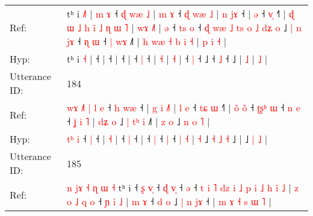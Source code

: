 \documentclass[10pt]{article}
\DeclareRobustCommand{\hl}[1]{{\textcolor{red}{#1}}}
\begin{document}
\begin{longtable}{ll}
Ref: & tʰ i \hl{˩}\hl{˥} |\hl{ }\hl{m}\hl{ }\hl{ɤ} ˧\hl{ }\hl{ɖ}\hl{ }\hl{w}\hl{æ}\hl{ }\hl{˩} |\hl{ }\hl{m}\hl{ }\hl{ɤ} ˧\hl{ }\hl{ɖ}\hl{ }\hl{w}\hl{æ}\hl{ }\hl{˩} |\hl{ }\hl{n}\hl{ }\hl{j}\hl{ɤ} ˧ |\hl{ }\hl{ə} ˧ \hl{v}\hl{̩} ˧\hl{˥} |\hl{ }\hl{ɖ}\hl{ }\hl{ɯ}\hl{ }\hl{˩}\hl{ }\hl{h}\hl{ }\hl{i}\hl{̃}\hl{ }\hl{˩}\hl{ }\hl{ɳ}\hl{ }\hl{ɯ} \hl{˥} |\hl{ }\hl{w}\hl{ɤ} \hl{˩}\hl{˥} |\hl{ }\hl{ə} ˧\hl{ }\hl{t}\hl{s} \hl{o} ˧\hl{ }\hl{ɖ}\hl{ }\hl{w}\hl{æ}\hl{ }\hl{˩}\hl{ }\hl{t}\hl{s}\hl{ }\hl{o}\hl{ }\hl{˩}\hl{ }\hl{d}\hl{ʑ}\hl{ }\hl{o} ˩\hl{ }\hl{|}\hl{ }\hl{n}\hl{ }\hl{j}\hl{ɤ} ˧\hl{ }\hl{ɳ} \hl{ɯ} ˧\hl{ }\hl{|}\hl{ }\hl{w}\hl{ɤ} ˩\hl{˥} |\hl{ }\hl{h}\hl{ }\hl{w}\hl{æ}\hl{ }\hl{˧}\hl{ }\hl{b}\hl{ }\hl{i} \hl{˧} |\hl{ }\hl{p}\hl{ }\hl{i} \hl{˧} |
 \\
Hyp: & tʰ i \hl{}\hl{˧} |\hl{}\hl{}\hl{}\hl{} ˧\hl{}\hl{}\hl{}\hl{}\hl{}\hl{}\hl{} |\hl{}\hl{}\hl{}\hl{} ˧\hl{}\hl{}\hl{}\hl{}\hl{}\hl{}\hl{} |\hl{}\hl{}\hl{}\hl{}\hl{} ˧ |\hl{}\hl{} ˧ \hl{}\hl{|} ˧\hl{} |\hl{}\hl{}\hl{}\hl{}\hl{}\hl{}\hl{}\hl{}\hl{}\hl{}\hl{}\hl{}\hl{}\hl{}\hl{}\hl{}\hl{} \hl{˧} |\hl{}\hl{}\hl{} \hl{}\hl{˧} |\hl{}\hl{} ˧\hl{}\hl{}\hl{} \hl{|} ˧\hl{}\hl{}\hl{}\hl{}\hl{}\hl{}\hl{}\hl{}\hl{}\hl{}\hl{}\hl{}\hl{}\hl{}\hl{}\hl{}\hl{}\hl{}\hl{} ˩\hl{}\hl{}\hl{}\hl{}\hl{}\hl{}\hl{} ˧\hl{}\hl{} \hl{˩} ˧\hl{}\hl{}\hl{}\hl{}\hl{} ˩\hl{} |\hl{}\hl{}\hl{}\hl{}\hl{}\hl{}\hl{}\hl{}\hl{}\hl{}\hl{} \hl{˩} |\hl{}\hl{}\hl{}\hl{} \hl{˩} |
 \\
\midrule
Utterance ID: & 184 \\
Ref: & \hl{w}\hl{ɤ}\hl{ }\hl{˩}\hl{˥}\hl{ }\hl{|}\hl{ }\hl{l} \hl{e} ˧\hl{ }\hl{h} \hl{w}\hl{æ} ˧ |\hl{ }\hl{g}\hl{ }\hl{i} \hl{˩}\hl{˥} |\hl{ }\hl{l}\hl{ }\hl{e} ˧\hl{ }\hl{t}\hl{ɕ} \hl{ɯ} ˧\hl{˥} |\hl{ }\hl{o}\hl{̃}\hl{ }\hl{o}\hl{̃} ˧\hl{ }\hl{ʈ}\hl{ʂ}\hl{ʰ} \hl{ɯ} ˧\hl{ }\hl{n} \hl{e} ˧\hl{ }\hl{ʝ} \hl{i} \hl{˥} |\hl{ }\hl{d}\hl{ʑ} \hl{o} ˩ \hl{|} \hl{t}\hl{ʰ} \hl{i} ˩\hl{˥} |\hl{ }\hl{z}\hl{ }\hl{o} ˩\hl{ }\hl{n} \hl{o} \hl{˥} |
 \\
Hyp: & \hl{}\hl{}\hl{}\hl{}\hl{}\hl{}\hl{}\hl{t}\hl{ʰ} \hl{i} ˧\hl{}\hl{} \hl{}\hl{|} ˧ |\hl{}\hl{}\hl{}\hl{} \hl{}\hl{˧} |\hl{}\hl{}\hl{}\hl{} ˧\hl{}\hl{}\hl{} \hl{|} ˧\hl{} |\hl{}\hl{}\hl{}\hl{}\hl{}\hl{} ˧\hl{}\hl{}\hl{}\hl{} \hl{|} ˧\hl{}\hl{} \hl{|} ˧\hl{}\hl{} \hl{|} \hl{˧} |\hl{}\hl{}\hl{} \hl{˧} ˩ \hl{˧} \hl{}\hl{˩} \hl{˧} ˩\hl{} |\hl{}\hl{}\hl{}\hl{} ˩\hl{}\hl{} \hl{|} \hl{˩} |
 \\
\midrule
Utterance ID: & 185 \\
Ref: & \hl{n}\hl{ }\hl{j}\hl{ɤ}\hl{ }\hl{˧}\hl{ }\hl{ɳ}\hl{ }\hl{ɯ}\hl{ }\hl{˧}\hl{ }tʰ i ˧\hl{ }\hl{ʂ} \hl{v}\hl{̩} ˧\hl{ }\hl{ɖ} \hl{v}\hl{̩} ˧ \hl{ə} ˧\hl{ }\hl{t}\hl{ }\hl{i}\hl{ }\hl{˥}\hl{ }\hl{d}\hl{z}\hl{ }\hl{i}\hl{ }\hl{˩}\hl{ }\hl{p}\hl{ }\hl{i}\hl{ }\hl{˩}\hl{ }\hl{h}\hl{ }\hl{i}\hl{̃}\hl{ }\hl{˩} |\hl{ }\hl{z}\hl{ }\hl{o}\hl{ }\hl{˩}\hl{ }\hl{q}\hl{ }\hl{o} ˧\hl{ }\hl{ɲ}\hl{ }\hl{i}\hl{ }\hl{˩} |\hl{ }\hl{m}\hl{ }\hl{ɤ} ˧\hl{ }\hl{d}\hl{ }\hl{o} ˩\hl{ }\hl{|}\hl{ }\hl{n}\hl{ }\hl{j}\hl{ɤ} ˧ |\hl{ }\hl{m}\hl{ }\hl{ɤ}\hl{ }\hl{˧} \hl{s} \hl{ɯ} \hl{˥} |

\end{longtable}
\end{document}
